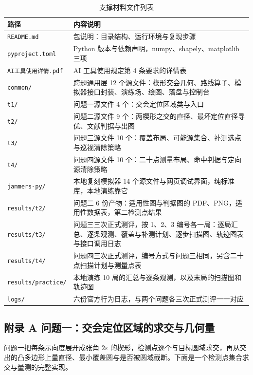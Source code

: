 \documentclass[UTF8, zihao=5,AutoFakeBold=2]{ctexart}
\begin{document}
\begin{table}[H]
\centering
\caption{支撑材料文件列表}
\label{tab:materials}
\begin{tabular}{@{}p{}p{}@{}}
\toprule
路径 & 内容说明 \\
\midrule
\texttt{README.md} & 包说明：目录结构、运行环境与复现步骤 \\
\texttt{pyproject.toml} & Python 版本与依赖声明，numpy、shapely、matplotlib 三项 \\
\texttt{AI工具使用详情.pdf} & AI 工具使用规定第 4 条要求的详情表 \\
\texttt{common/} & 跨题通用层 12 个源文件：楔形交会几何、路线算子、模拟器接口封装、演练场、绘图、落盘与控制台 \\
\texttt{t1/} & 问题一源文件 4 个：交会定位区域类与入口 \\
\texttt{t2/} & 问题二源文件 9 个：两楔形之交的直径、最坏定位直径寻优、文献判据与出图 \\
\texttt{t3/} & 问题三源文件 10 个：覆盖布局、可能源集合、补测选点与巡视清除策略 \\
\texttt{t4/} & 问题四源文件 10 个：二十点测量布局、命中判据与定向源清除策略 \\
\texttt{jammers-py/} & 本地复刻模拟器 14 个源文件与网页调试界面，纯标准库，本地演练靠它 \\
\texttt{results/t2/} & 问题二 6 份产物：适用性图与判据图的 PDF、PNG，适用性数据表，第二检测点结果 \\
\texttt{results/t3/} & 问题三三次正式测评，按 1、2、3 编号各一局：逐局汇总、逐条观测、覆盖与补测计划、逐步扫描图、轨迹图表与接口调用日志 \\
\texttt{results/t4/} & 问题四三次正式测评，编号方式与问题三相同，另含二十点扫描计划与测量点表 \\
\texttt{results/practice/} & 本地演练 10 局的汇总与逐条观测，以及末局的扫描图和轨迹图 \\
\texttt{logs/} & 六份官方行为日志，与两个问题各三次正式测评一一对应 \\
\bottomrule
\end{tabular}
\end{table}

\subsection*{附录 A \quad 问题一：交会定位区域的求交与几何量}

	\noindent 问题一把每条示向度展开成张角 $2\varepsilon$ 的楔形，检测点逐个与目标圆域求交，再从交出的凸多边形上量直径、最小覆盖圆与是否被圆域截断。下面是一个检测点集合求交与量测的完整实现。
\end{document}
